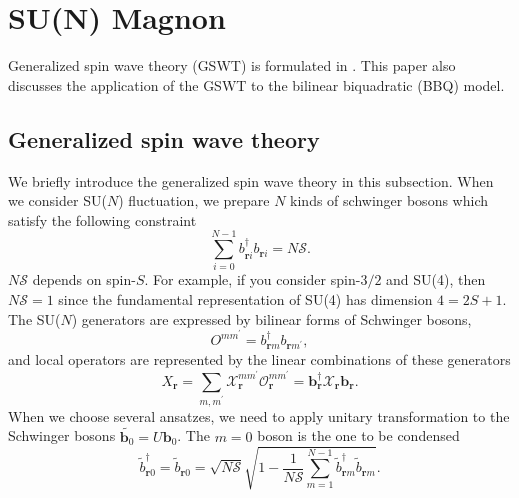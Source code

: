 \documentclass[11pt, aps, longbibliography]{article}
\begin{document}
\newpage

\section{SU(N) Magnon}
Generalized spin wave theory (GSWT) is formulated in \cite{10.1093/ptep/ptu109}. This paper also discusses the application of the GSWT to the bilinear biquadratic (BBQ) model. 

\subsection{Generalized spin wave theory}
We briefly introduce the generalized spin wave theory in this subsection.
When we consider SU($N$) fluctuation, we prepare $N$ kinds of schwinger bosons which satisfy the following constraint
\begin{equation}\label{eq:GSWT1-1}
    \sum_{i=0}^{N-1} b_{\bm{r} i}^\dagger b_{\bm{r} i} = N\mathcal{S}.
\end{equation}
$N\mathcal{S}$ depends on spin-$S$. For example, if you consider spin-$3/2$ and SU(4), then $N\mathcal{S}=1$
since the fundamental representation of SU(4) has dimension $4=2S+1$.
The SU($N$) generators are expressed by bilinear forms of Schwinger bosons,
\begin{equation}\label{eq:GSWT1-2}
    O^{mm^\prime} = b_{\bm{r} m}^\dagger b_{\bm{r} m^\prime},
\end{equation}
and local operators are represented by the linear combinations of these generators
\begin{equation}\label{eq:GSWT1-3}
    X_{\bm{r}} = \sum_{m,m^\prime}\mathcal{X}_{\bm{r}}^{mm^\prime} \mathcal{O}_{\bm{r}}^{mm^\prime} = \mathbf{b}_{\bm{r}}^\dagger \mathcal{X}_{\bm{r}}\mathbf{b}_{\bm{r}}.
\end{equation}
When we choose several ansatzes, we need to apply unitary transformation to the Schwinger bosons $\tilde{\mathbf{b}_0} = U\mathbf{b}_0$.
The $m=0$ boson is the one to be condensed
\begin{equation}\label{eq:GSWT1-4}
    \tilde{b}_{\bm{r}0}^\dagger = \tilde{b}_{\bm{r}0} = \sqrt{N\mathcal{S}} \sqrt{1-\frac{1}{N\mathcal{S}}\sum_{m=1}^{N-1}\tilde{b}_{\bm{r}m}^\dagger\tilde{b}_{\bm{r}m}}.
\end{equation}
\end{document}
